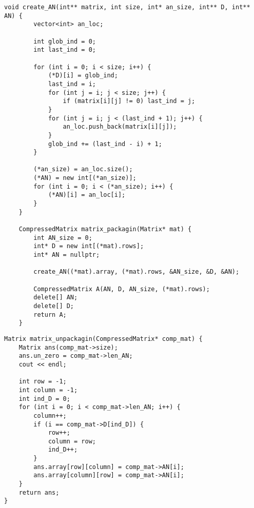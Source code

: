 \begin{lstlisting}[label = list3, caption = Программная реализация алгоритма упавковки по Дженнингсу]
	void create_AN(int** matrix, int size, int* an_size, int** D, int** AN) {
		vector<int> an_loc;
		
		int glob_ind = 0;
		int last_ind = 0;
		
		for (int i = 0; i < size; i++) {
			(*D)[i] = glob_ind;
			last_ind = i;
			for (int j = i; j < size; j++) {
				if (matrix[i][j] != 0) last_ind = j;
			}
			for (int j = i; j < (last_ind + 1); j++) {
				an_loc.push_back(matrix[i][j]);
			}
			glob_ind += (last_ind - i) + 1;
		}
		
		(*an_size) = an_loc.size();
		(*AN) = new int[(*an_size)];
		for (int i = 0; i < (*an_size); i++) {
			(*AN)[i] = an_loc[i];
		}
	}
	
	CompressedMatrix matrix_packagin(Matrix* mat) {
		int AN_size = 0;
		int* D = new int[(*mat).rows];
		int* AN = nullptr;
		
		create_AN((*mat).array, (*mat).rows, &AN_size, &D, &AN);
		
		CompressedMatrix A(AN, D, AN_size, (*mat).rows);
		delete[] AN;
		delete[] D;
		return A;
	}
\end{lstlisting}

\begin{lstlisting}[label = list4, caption = Программная реализация алгоритма распаковки из схемы Дженнингса]
Matrix matrix_unpackagin(CompressedMatrix* comp_mat) {
	Matrix ans(comp_mat->size);
	ans.un_zero = comp_mat->len_AN;
	cout << endl;
	
	int row = -1;
	int column = -1;
	int ind_D = 0;
	for (int i = 0; i < comp_mat->len_AN; i++) {
		column++;
		if (i == comp_mat->D[ind_D]) {
			row++;
			column = row;
			ind_D++;
		}
		ans.array[row][column] = comp_mat->AN[i];
		ans.array[column][row] = comp_mat->AN[i];
	}
	return ans;
}
\end{lstlisting}

